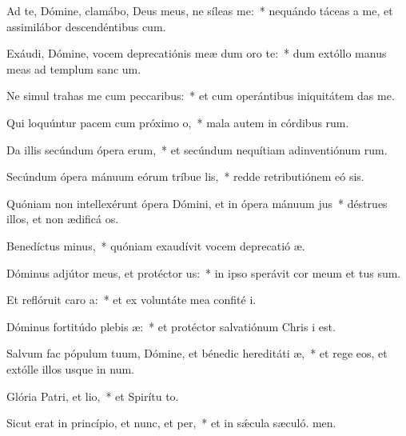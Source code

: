 \item Ad te, Dómine, clamábo, Deus meus, ne síleas  me:~* nequándo táceas a me, et assimilábor descendéntibus  cum.
\item Exáudi, Dómine, vocem deprecatiónis meæ dum oro  te:~* dum extóllo manus meas ad templum sanc um.
\item Ne simul trahas me cum peccaribus:~* et cum operántibus iniquitátem  das me.
\item Qui loquúntur pacem cum próximo o,~* mala autem in córdibus rum.
\item Da illis secúndum ópera erum,~* et secúndum nequítiam adinventiónum rum.
\item Secúndum ópera mánuum eórum tríbue lis,~* redde retributiónem eó sis.
\item Quóniam non intellexérunt ópera Dómini, et in ópera mánuum jus~* déstrues illos, et non ædificá os.
\item Benedíctus minus,~* quóniam exaudívit vocem deprecatió æ.
\item Dóminus adjútor meus, et protéctor us:~* in ipso sperávit cor meum et tus sum.
\item Et reflóruit caro a:~* et ex voluntáte mea confité i.
\item Dóminus fortitúdo plebis æ:~* et protéctor salvatiónum Chris i est.
\item Salvum fac pópulum tuum, Dómine, et bénedic hereditáti æ,~* et rege eos, et extólle illos usque in num.
\item Glória Patri, et lio,~* et Spirítu to.
\item Sicut erat in princípio, et nunc, et per,~* et in sǽcula sæculó. men.
